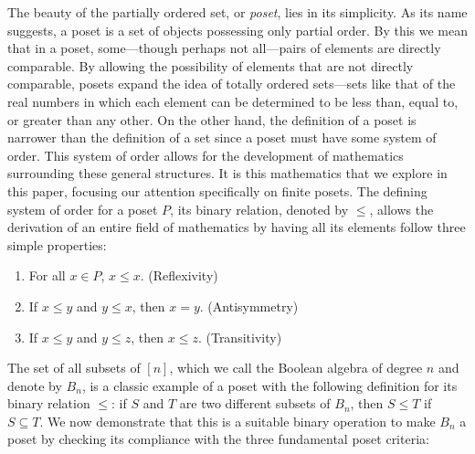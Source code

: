 \documentclass{article} %
\theoremstyle{definition}
\theoremstyle{plain}
\begin{document}
The beauty of the partially ordered set, or \textit{poset}, lies in its simplicity. As its name suggests, a poset is a set of objects possessing only partial order. By this we mean that in a poset, some---though perhaps not all---pairs of elements are directly comparable. By allowing the possibility of elements that are not directly comparable, posets expand the idea of totally ordered sets---sets like that of the real numbers in which each element can be determined to be less than, equal to, or greater than any other. On the other hand, the definition of a poset is narrower than the definition of a set since a poset must have some system of order. This system of order allows for the development of mathematics surrounding these general structures. It is this mathematics that we explore in this paper, focusing our attention specifically on finite posets. The defining system of order for a poset $P$, its binary relation, denoted by $\leq$, allows the derivation of an entire field of mathematics by having all its elements follow three simple properties:
\begin{enumerate}
\item{For all $x \in P$, $x \leq x$. (Reflexivity)}
\item{If $x \leq y$ and $y \leq x$, then $x=y$. (Antisymmetry)}
\item{If $x \leq y$ and $y \leq z$, then $x \leq z$. (Transitivity)}
\end{enumerate}
The set of all subsets of $[n]$, which we call the Boolean algebra of degree $n$ and denote by $B_n$, is a classic example of a poset with the following definition for its binary relation $\leq$: if $S$ and $T$ are two different subsets of $B_{n}$, then $S \leq T$ if $S \subseteq T$. We now demonstrate that this is a suitable binary operation to make $B_{n}$ a poset by checking its compliance with the three fundamental poset criteria:
\end{document}
